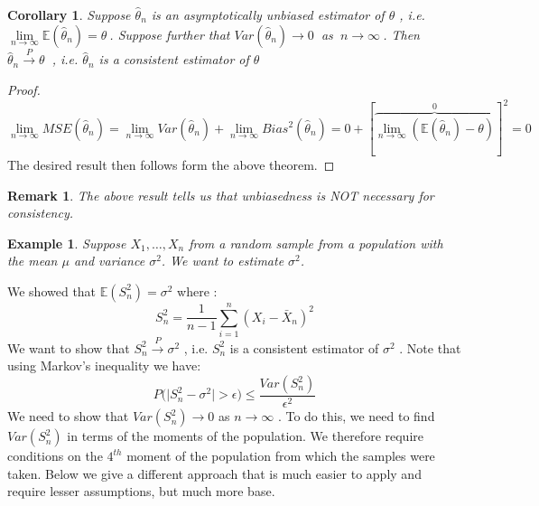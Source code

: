 \documentclass[14pt,twoside,a4paper,fleqn]{article}
\theoremstyle{plain}
\newtheorem{example}{Example}[section]
\newtheorem{corollary}{Corollary}[section]
\newtheorem*{remark*}{Remark}
\begin{document}
\begin{corollary}
Suppose $\hat{\theta}_n$ is an asymptotically unbiased estimator of $\theta$ , i.e. \mbox{$\lim\limits_{n\to\infty} \mathbb{E}(\hat{\theta}_n) = \theta\ $}. Suppose further that \mbox{$Var(\hat{\theta}_n)\to 0\ $} as $\ n\to\infty\ $. Then $\hat{\theta}_n \xrightarrow{P}\theta\ $ , i.e. $\hat{\theta}_n$ is a consistent estimator of $\theta$ 
\end{corollary}
\begin{proof}
$$
	\lim\limits_{n\to\infty} MSE(\hat{\theta}_n) = \lim\limits_{n\to\infty} Var(\hat{\theta}_n) + \lim\limits_{n\to\infty} Bias^2(\hat{\theta}_n) = 0+[\overbrace{\lim\limits_{n\to\infty}(\mathbb{E}(\hat{\theta}_n)-\theta)}^0]^2 = 0
$$
The desired result then follows form the above theorem.
\end{proof}
\begin{remark*}
The above result tells us that unbiasedness is NOT necessary for consistency.
\end{remark*}
\begin{example}
Suppose $X_1,\ldots,X_n$ from a random sample from a population with the mean $\mu$ and variance $\sigma^2$. We want to estimate $\sigma^2$.
\end{example}
We showed that $\mathbb{E}(S^2_n) = \sigma^2$ where :
$$
	S_n^2 = \frac{1}{n-1} \sum_{i=1}^n (X_i - \bar{X}_n)^2
$$
We want to show that $S_n^2 \xrightarrow{P}\sigma^2$ , i.e. $S_n^2$ is a consistent estimator of $\sigma^2$ . Note that using Markov's inequality we have:
$$
	P\big(\vert S^2_n - \sigma^2\vert > \epsilon\big) \leq \frac{Var(S^2_n)}{\epsilon^2}
$$
We need to show that $Var(S^2_n)\to 0$ as $n\to\infty$ . To do this, we need to find $Var(S^2_n)$ in terms of the moments of the population. We therefore require conditions on the $4^{th}$ moment of the population from which the samples were taken. Below we give a different approach that is much easier to apply and require lesser assumptions, but much more base.
\end{document}
